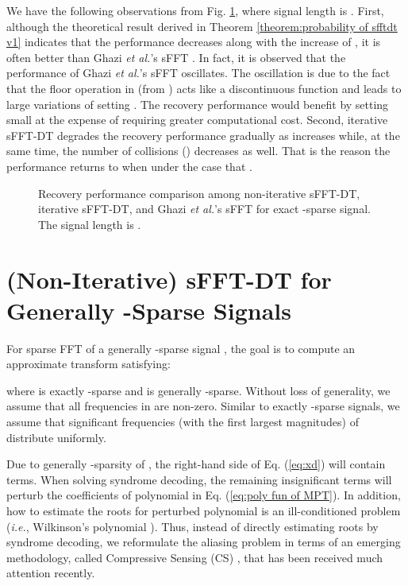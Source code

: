 \documentclass[journal,onecolumn,11pt]{IEEEtran}
\begin{document}
We have the following observations from Fig. \ref{fig:Performance}, where signal length is .
First, although the theoretical result derived in Theorem \ref{theorem:probability of sfftdt v1} indicates that the performance decreases along with the increase of , it is often better than Ghazi {\em et al.}'s sFFT \cite{Ghazi2013}.
In fact, it is observed that the performance of Ghazi {\em et al.}'s sFFT oscillates.
The oscillation is due to the fact that the floor operation in  (from ) acts like a discontinuous function and leads to large variations of setting .
The recovery performance would benefit by setting small  at the expense of requiring greater computational cost.
Second, iterative sFFT-DT degrades the recovery performance gradually as  increases while, at the same time, the number of collisions () decreases as well.
That is the reason the performance returns to  when  under the case that .

\begin{figure}[t]
\begin{minipage}[b]{.98\linewidth}
\end{minipage}
\hfill
\caption{Recovery performance comparison among non-iterative sFFT-DT, iterative sFFT-DT, and Ghazi {\em et al.}'s sFFT \cite{Ghazi2013} for exact -sparse signal. The signal length is .}
\label{fig:Performance}
\end{figure}


\section{(Non-Iterative) sFFT-DT for Generally -Sparse Signals}\label{Sec: sFFT-DT: General K-Sparse}
For sparse FFT of a generally -sparse signal , the goal is to compute an approximate transform  satisfying:
\small

\normalsize
where  is exactly -sparse and  is generally -sparse. Without loss of generality, we assume that all frequencies in  are non-zero.
Similar to exactly -sparse signals, we assume that  significant frequencies (with the first  largest magnitudes) of  distribute uniformly.

Due to generally -sparsity of , the right-hand side of Eq. (\ref{eq:xd}) will contain  terms.
When solving syndrome decoding, the remaining insignificant terms will perturb the coefficients of polynomial in Eq. (\ref{eq:poly fun of MPT}).
In addition, how to estimate the roots for perturbed polynomial is an ill-conditioned problem ({\em i.e.}, Wilkinson's polynomial \cite{Wilkinson1959}).
Thus, instead of directly estimating roots by syndrome decoding, we reformulate the aliasing problem in terms of an emerging methodology, called Compressive Sensing (CS) \cite{Donoho2006}\cite{Candes2008}, that has been received much attention recently.
\end{document}
